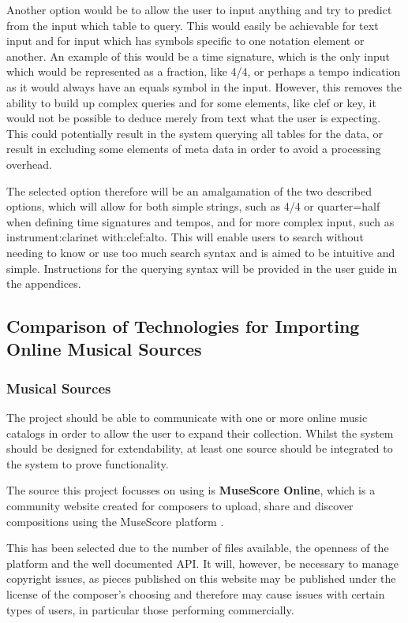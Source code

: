 Another option would be to allow the user to input anything and try to predict from the input which table to query. This would easily be achievable for text input and for input which has symbols specific to one notation element or another. An example of this would be a time signature, which is the only input which would be represented as a fraction, like 4/4, or perhaps a tempo indication as it would always have an equals symbol in the input.
However, this removes the ability to build up complex queries and for some elements, like clef or key, it would not be possible to deduce merely from text what the user is expecting. This could potentially result in the system querying all tables for the data, or result in excluding some elements of meta data in order to avoid a processing overhead.

The selected option therefore will be an amalgamation of the two described options, which will allow for both simple strings, such as 4/4 or quarter=half when defining time signatures and tempos, and for more complex input, such as instrument:clarinet with:clef:alto. This will enable users to search without needing to know or use too much search syntax and is aimed to be intuitive and simple. Instructions for the querying syntax will be provided in the user guide in the appendices.



\subsection{Comparison of Technologies for Importing Online Musical Sources}
\subsubsection{Musical Sources}
The project should be able to communicate with one or more online music catalogs in order to allow the user to expand their collection. Whilst the system should be designed for extendability, at least one source should be integrated to the system to prove functionality.

The source this project focusses on using is \textbf{MuseScore Online}, which is a community website created for composers to upload, share and discover compositions using the MuseScore platform \parencite{MuseShare}.

This has been selected due to the number of files available, the openness of the platform and the well documented API. It will, however, be necessary to manage copyright issues, as pieces published on this website may be published under the license of the composer's choosing and therefore may cause issues with certain types of users, in particular those performing commercially.


